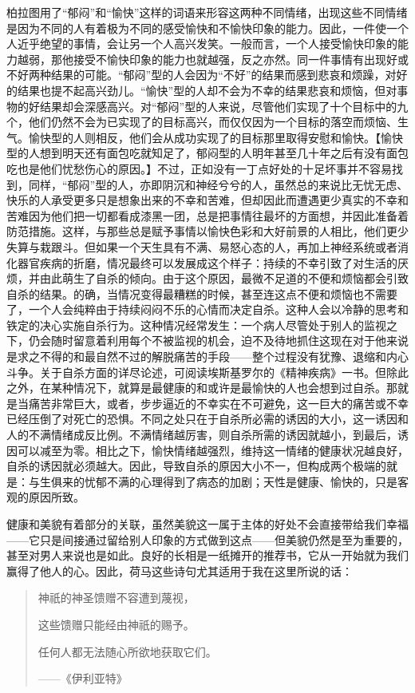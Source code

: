 \documentclass[12pt,oneside]{book}
\begin{document}
柏拉图用了“郁闷”和“愉快”这样的词语来形容这两种不同情绪，出现这些不同情绪是因为不同的人有着极为不同的感受愉快和不愉快印象的能力。因此，一件使一个人近乎绝望的事情，会让另一个人高兴发笑。一般而言，一个人接受愉快印象的能力越弱，那他接受不愉快印象的能力也就越强，反之亦然。同一件事情有出现好或不好两种结果的可能。“郁闷”型的人会因为“不好”的结果而感到悲哀和烦躁，对好的结果也提不起高兴劲儿。“愉快”型的人却不会为不幸的结果悲哀和烦恼，但对事物的好结果却会深感高兴。对“郁闷”型的人来说，尽管他们实现了十个目标中的九个，他们仍然不会为已实现了的目标高兴，而仅仅因为一个目标的落空而烦恼、生气。愉快型的人则相反，他们会从成功实现了的目标那里取得安慰和愉快。【愉快型的人想到明天还有面包吃就知足了，郁闷型的人明年甚至几十年之后有没有面包吃也是他们忧愁伤心的原因。】不过，正如没有一丁点好处的十足坏事并不容易找到，同样，“郁闷”型的人，亦即阴沉和神经兮兮的人，虽然总的来说比无忧无虑、快乐的人承受更多只是想象出来的不幸和苦难，但却因此而遭遇更少真实的不幸和苦难因为他们把一切都看成漆黑一团，总是把事情往最坏的方面想，并因此准备着防范措施。这样，与那些总是赋予事情以愉快色彩和大好前景的人相比，他们更少失算与栽跟斗。但如果一个天生具有不满、易怒心态的人，再加上神经系统或者消化器官疾病的折磨，情况最终可以发展成这个样子：持续的不幸引致了对生活的厌烦，并由此萌生了自杀的倾向。由于这个原因，最微不足道的不便和烦恼都会引致自杀的结果。的确，当情况变得最糟糕的时候，甚至连这点不便和烦恼也不需要了，一个人会纯粹由于持续闷闷不乐的心情而决定自杀。这种人会以冷静的思考和铁定的决心实施自杀行为。这种情况经常发生：一个病人尽管处于别人的监视之下，仍会随时留意着利用每个不被监视的机会，迫不及待地抓住这现在对于他来说是求之不得的和最自然不过的解脱痛苦的手段——整个过程没有犹豫、退缩和内心斗争。关于自杀方面的详尽论述，可阅读埃斯基罗尔的《精神疾病》一书。但除此之外，在某种情况下，就算是最健康的和或许是最愉快的人也会想到过自杀。那就是当痛苦非常巨大，或者，步步逼近的不幸实在不可避免，这一巨大的痛苦或不幸已经压倒了对死亡的恐惧。不同之处只在于自杀所必需的诱因的大小，这一诱因和人的不满情绪成反比例。不满情绪越厉害，则自杀所需的诱因就越小，到最后，诱因可以减至为零。相比之下，愉快情绪越强烈，维持这一情绪的健康状况越良好，自杀的诱因就必须越大。因此，导致自杀的原因大小不一，但构成两个极端的就是：与生俱来的忧郁不满的心理得到了病态的加剧；天性是健康、愉快的，只是客观的原因所致。 

健康和美貌有着部分的关联，虽然美貌这一属于主体的好处不会直接带给我们幸福——它只是间接通过留给别人印象的方式做到这点——但美貌仍然是至为重要的，甚至对男人来说也是如此。良好的长相是一纸摊开的推荐书，它从一开始就为我们赢得了他人的心。因此，荷马这些诗句尤其适用于我在这里所说的话： 

 
\begin{quotation}
神祇的神圣馈赠不容遭到蔑视， 

这些馈赠只能经由神祇的赐予。 

任何人都无法随心所欲地获取它们。 

——《伊利亚特》 

\end{quotation}
\end{document}
